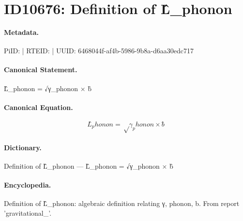 \section*{ID10676: Definition of L̂\_phonon}
\paragraph{Metadata.}
PiID:  | RTEID:  | UUID: 6468044f-af4b-5986-9b8a-d6aa30edc717

\paragraph{Canonical Statement.}
L̂\_phonon = √γ\_phonon × b̂

\paragraph{Canonical Equation.}
\[
L̂_phonon = √γ_phonon × b̂
\]

\paragraph{Dictionary.}
Definition of L̂\_phonon — L̂\_phonon = √γ\_phonon × b̂

\paragraph{Encyclopedia.}
Definition of L̂\_phonon: algebraic definition relating γ, phonon, b. From report 'gravitational\_'.
